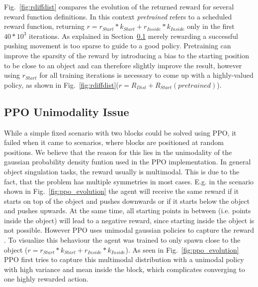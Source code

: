 \documentclass{article}
\newcommand{\myfigref}[1]{Fig.~\ref{#1}}
\newcommand{\mysecref}[1]{Section~\ref{#1}}
\begin{document}
\myfigref{fig:rdiffdist} compares the evolution of the returned reward for several reward function definitions. In this context \textit{pretrained} refers to a scheduled reward function, returning $r = r_{Start}*k_{Start} + r_{Inside}*k_{Inside}$ only in the first $40*10^3$ iterations. As explained in \mysecref{sec:unimodality} merely rewarding a successful pushing movement is too sparse to guide to a good policy. Pretraining can improve the sparsity of the reward by introducing a bias to the starting position to be close to an object and can therefore slightly improve the result, however using $r_{Start}$ for all training iterations is necessary to come up with a highly-valued policy, as shown in \myfigref{fig:rdiffdist}($r = R_{Dist} + R_{Start} (pretrained)$). 

\subsection{PPO Unimodality Issue}
\label{sec:unimodality}
While a simple fixed scenario with two blocks could be solved using PPO, it failed when it came to scenarios, where blocks are positioned at random positions. We believe that the reason for this lies in the unimodality of the gaussian probability density funtion used in the PPO implementation.
In general object singulation tasks, the reward usually is multimodal. This is due to the fact, that the problem has multiple symmetries in most cases. E.g. in the scenario shown in \myfigref{fig:ppo_evolution} the agent will receive the same reward if it starts on top of the object and pushes downwards or if it starts below the object and pushes upwards. At the same time, all starting points in between (i.e. points inside the object) will lead to a negative reward, since starting inside the object is not possible. However PPO uses unimodal gaussian policies to capture the reward \citep{ppo}\citep{Tang2018}. 
\newline
To visualize this behaviour the agent was trained to only spawn close to the object ($r = r_{Start}*k_{Start} + r_{Inside}*k_{Inside}$). As seen in \myfigref{fig:ppo_evolution} PPO first tries to capture this multimodal distribution with a unimodal policy with high variance and mean inside the block, which complicates converging to one highly rewarded action.

\end{document}
